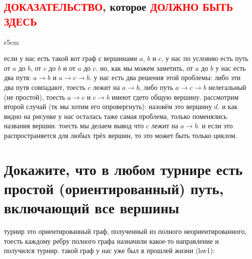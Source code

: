 \documentclass{article}
\begin{document}
  \subsection{\textcolor{red}{ДОКАЗАТЕЛЬСТВО}, которое \textcolor{red}{ДОЛЖНО БЫТЬ ЗДЕСЬ}}
  \begin{wrapfigure}{r}{5cm}
    \vspace{-.5cm}
    \vspace{-.5cm}
  \end{wrapfigure}
  если у нас есть такой вот граф с вершинами $a$, $b$ и $c$, у нас по условию есть путь от $a$ до $b$, от $c$ до $b$ и от $a$ до $c$.
  но, как мы можем заметить, от $a$ до $b$ у нас есть два путя: $a \to b$ и $a \to c \to b$.
  у нас есть два решения этой проблемы: либо эти два путя совпадают, тоесть $c$ лежит на $a \to b$,
  либо путь $a \to c \to b$ нелегальный (не простой), тоесть $a \to c$ и $c \to b$ имеют гдето общую вершину.
  рассмотрим второй случай (тк мы хотим его опровергнуть):
  назовём это вершину $d$. и как видно на рисунке у нас осталась таже самая проблема, только поменялись названия вершин.
  тоесть мы делаем вывод что $c$ лежит на $a \to b$.
  и если это распространяется для любых трёх вершин, то это может быть только циклом.

  \newpage
  \section{Докажите, что в любом турнире есть простой (ориентированный) путь, включающий все вершины}
  турнир это ориентированный граф, полученный из полного неориентированного,
  тоесть каждому ребру полного графа назначили какое-то направление и получился турнир.
  такой граф у нас уже был в прошлей жизни (hw1):
\end{document}
